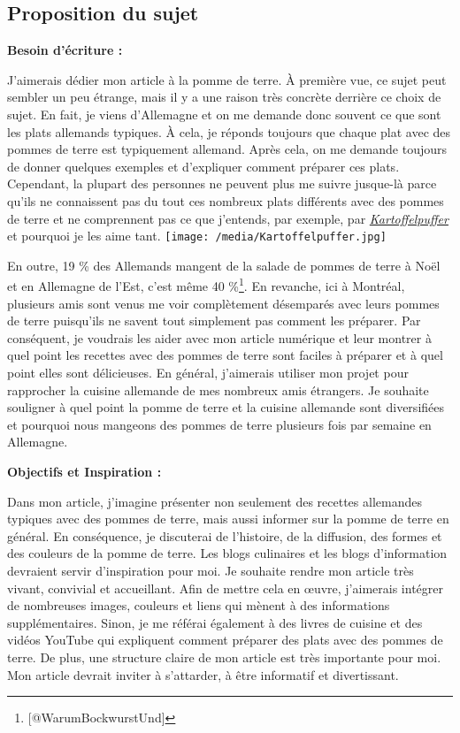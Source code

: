 \documentclass[12pt,french,letterpaper]{article}
\begin{document}
\normalsize{\hypertarget{proposition-du-sujet}{%
\subsection{Proposition du sujet}\label{proposition-du-sujet}}

\textbf{Besoin d'écriture :}

J'aimerais dédier mon article à la pomme de terre. À première vue, ce
sujet peut sembler un peu étrange, mais il y a une raison très concrète
derrière ce choix de sujet. En fait, je viens d'Allemagne et on me
demande donc souvent ce que sont les plats allemands typiques. À cela,
je réponds toujours que chaque plat avec des pommes de terre est
typiquement allemand. Après cela, on me demande toujours de donner
quelques exemples et d'expliquer comment préparer ces plats. Cependant,
la plupart des personnes ne peuvent plus me suivre jusque-là parce
qu'ils ne connaissent pas du tout ces nombreux plats différents avec des
pommes de terre et ne comprennent pas ce que j'entends, par exemple, par
\href{https://fr.wikipedia.org/wiki/Galette_de_pommes_de_terre}{\emph{Kartoffelpuffer}}
et pourquoi je les aime tant.
\texttt{[image: /media/Kartoffelpuffer.jpg]}

En outre, 19 \% des Allemands mangent de la salade de pommes de terre à
Noël et en Allemagne de l'Est, c'est même 40 \%\footnote{{[}@WarumBockwurstUnd{]}}.
En revanche, ici à Montréal, plusieurs amis sont venus me voir
complètement désemparés avec leurs pommes de terre puisqu'ils ne savent
tout simplement pas comment les préparer. Par conséquent, je voudrais
les aider avec mon article numérique et leur montrer à quel point les
recettes avec des pommes de terre sont faciles à préparer et à quel
point elles sont délicieuses. En général, j'aimerais utiliser mon projet
pour rapprocher la cuisine allemande de mes nombreux amis étrangers. Je
souhaite souligner à quel point la pomme de terre et la cuisine
allemande sont diversifiées et pourquoi nous mangeons des pommes de
terre plusieurs fois par semaine en Allemagne.

\textbf{Objectifs et Inspiration :}

Dans mon article, j'imagine présenter non seulement des recettes
allemandes typiques avec des pommes de terre, mais aussi informer sur la
pomme de terre en général. En conséquence, je discuterai de l'histoire,
de la diffusion, des formes et des couleurs de la pomme de terre. Les
blogs culinaires et les blogs d'information devraient servir
d'inspiration pour moi. Je souhaite rendre mon article très vivant,
convivial et accueillant. Afin de mettre cela en œuvre, j'aimerais
intégrer de nombreuses images, couleurs et liens qui mènent à des
informations supplémentaires. Sinon, je me référai également à des
livres de cuisine et des vidéos YouTube qui expliquent comment préparer
des plats avec des pommes de terre. De plus, une structure claire de mon
article est très importante pour moi. Mon article devrait inviter à
s'attarder, à être informatif et divertissant.

}
\end{document}

